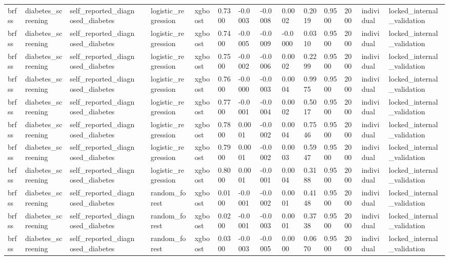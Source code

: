\begin{tabular}{lllllllllllllll}
brfss & diabetes\_screening & self\_reported\_diagnosed\_diabetes &  & logistic\_regression & xgboost & 0.7300 & -0.0003 & -0.0008 & 0.0002 & 0.2019 & 0.9500 & 2000 & individual & locked\_internal\_validation \\
brfss & diabetes\_screening & self\_reported\_diagnosed\_diabetes &  & logistic\_regression & xgboost & 0.7400 & -0.0005 & -0.0009 & -0.0000 & 0.0310 & 0.9500 & 2000 & individual & locked\_internal\_validation \\
brfss & diabetes\_screening & self\_reported\_diagnosed\_diabetes &  & logistic\_regression & xgboost & 0.7500 & -0.0002 & -0.0006 & 0.0002 & 0.2299 & 0.9500 & 2000 & individual & locked\_internal\_validation \\
brfss & diabetes\_screening & self\_reported\_diagnosed\_diabetes &  & logistic\_regression & xgboost & 0.7600 & -0.0000 & -0.0003 & 0.0004 & 0.9975 & 0.9500 & 2000 & individual & locked\_internal\_validation \\
brfss & diabetes\_screening & self\_reported\_diagnosed\_diabetes &  & logistic\_regression & xgboost & 0.7700 & -0.0001 & -0.0004 & 0.0002 & 0.5017 & 0.9500 & 2000 & individual & locked\_internal\_validation \\
brfss & diabetes\_screening & self\_reported\_diagnosed\_diabetes &  & logistic\_regression & xgboost & 0.7800 & 0.0001 & -0.0002 & 0.0004 & 0.7546 & 0.9500 & 2000 & individual & locked\_internal\_validation \\
brfss & diabetes\_screening & self\_reported\_diagnosed\_diabetes &  & logistic\_regression & xgboost & 0.7900 & 0.0001 & -0.0002 & 0.0003 & 0.5947 & 0.9500 & 2000 & individual & locked\_internal\_validation \\
brfss & diabetes\_screening & self\_reported\_diagnosed\_diabetes &  & logistic\_regression & xgboost & 0.8000 & 0.0001 & -0.0001 & 0.0004 & 0.3188 & 0.9500 & 2000 & individual & locked\_internal\_validation \\
brfss & diabetes\_screening & self\_reported\_diagnosed\_diabetes &  & random\_forest & xgboost & 0.0100 & -0.0001 & -0.0002 & 0.0001 & 0.4148 & 0.9500 & 2000 & individual & locked\_internal\_validation \\
brfss & diabetes\_screening & self\_reported\_diagnosed\_diabetes &  & random\_forest & xgboost & 0.0200 & -0.0001 & -0.0003 & 0.0001 & 0.3738 & 0.9500 & 2000 & individual & locked\_internal\_validation \\
brfss & diabetes\_screening & self\_reported\_diagnosed\_diabetes &  & random\_forest & xgboost & 0.0300 & -0.0003 & -0.0005 & 0.0000 & 0.0670 & 0.9500 & 2000 & individual & locked\_internal\_validation \\

\end{tabular}
